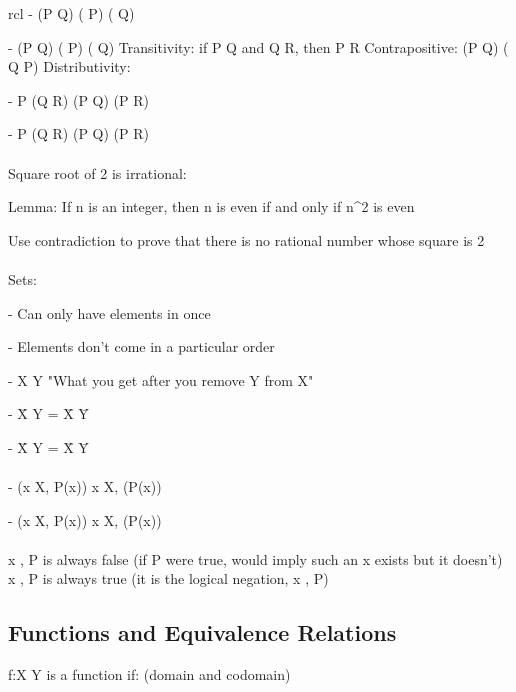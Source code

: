 \documentclass{article}
\begin{document}
\begin{arrary}{rcl}
- \neg\) (P \vee\) Q) \Leftrightarrow\) (\neg\) P) \wedge\) (\neg\) Q)

- \neg\) (P \wedge\) Q) \Leftrightarrow\) (\neg\) P) \vee\) (\neg\) Q)
\newline Transitivity: if P \Rightarrow\) Q and Q \Rightarrow\) R, then P \Rightarrow\) R
\newline Contrapositive: (P \Rightarrow\) Q) \Leftrightarrow\) (\neg\) Q \Rightarrow \neg\) P)
\newline Distributivity:

- P \wedge\) (Q \vee\) R) \Leftrightarrow\) (P \wedge\) Q) \vee\) (P \wedge\) R)

- P \vee\) (Q \wedge\) R) \Leftrightarrow\) (P \vee\) Q) \wedge\) (P \vee\) R)
\\
\\
Square root of 2 is irrational:

Lemma: If n is an integer, then n is even if and only if n^2 is even

Use contradiction to prove that there is no rational number whose square is 2
\\
\\
Sets:

- Can only have elements in once

- Elements don't come in a particular order

- X \diagdown\) Y "What you get after you remove Y from X"

- \={X \cup Y} = \={X} \cap \={Y}

- \={X \cap Y} = \={X} \cup \={Y}\)
\\
\\
- \neg (\forall x \in X, P(x)) \Leftrightarrow \exists x \in X, \neg (P(x))

- \neg (\exists x \in X, P(x)) \Leftrightarrow \forall x \in X, \neg (P(x))\)
\\
\\
\exists x \in \varnothing\), P is always false (if P were true, would imply such an x exists but it doesn't)
\newline \forall x \in \varnothing\), P is always true (it is the logical negation, \exists x \in \varnothing, \neg P\))

\subsection{Functions and Equivalence Relations}

\math f:X \rightarrow Y\) is a function if: (domain and codomain)


\end{arrary}
\end{document}
